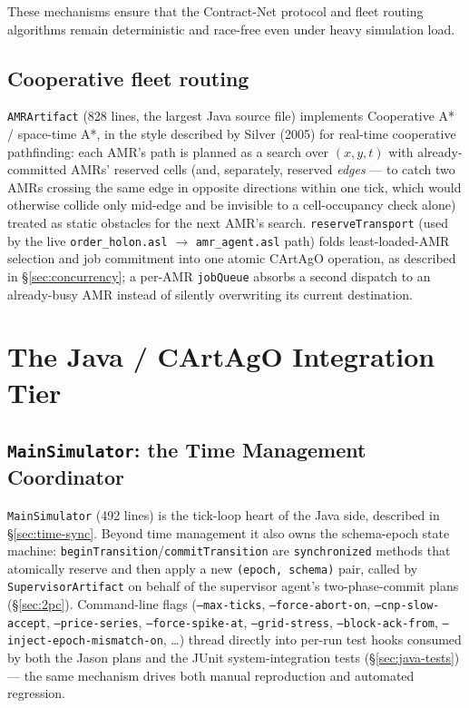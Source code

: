 \documentclass[twocolumn,10pt,a4paper]{article}
\newcommand{\code}[1]{\texttt{\small #1}}
\begin{document}
These mechanisms ensure that the Contract-Net protocol and fleet routing algorithms remain deterministic and race-free even under heavy simulation load.

\subsection{Cooperative fleet routing}
\code{AMRArtifact} (828 lines, the largest Java source file) implements Cooperative A* / space-time A*, in the style described by Silver (2005) for real-time cooperative pathfinding: each AMR's path is planned as a search over $(x, y, t)$ with already-committed AMRs' reserved cells (and, separately, reserved \emph{edges} --- to catch two AMRs crossing the same edge in opposite directions within one tick, which would otherwise collide only mid-edge and be invisible to a cell-occupancy check alone) treated as static obstacles for the next AMR's search. \code{reserveTransport} (used by the live \code{order\_holon.asl} $\to$ \code{amr\_agent.asl} path) folds least-loaded-AMR selection and job commitment into one atomic CArtAgO operation, as described in \S\ref{sec:concurrency}; a per-AMR \code{jobQueue} absorbs a second dispatch to an already-busy AMR instead of silently overwriting its current destination.

\section{The Java / CArtAgO Integration Tier}
\label{ch:java}

\subsection{\code{MainSimulator}: the Time Management Coordinator}
\code{MainSimulator} (492 lines) is the tick-loop heart of the Java side, described in \S\ref{sec:time-sync}. Beyond time management it also owns the schema-epoch state machine: \code{beginTransition}/\code{commitTransition} are \code{synchronized} methods that atomically reserve and then apply a new \code{(epoch, schema)} pair, called by \code{SupervisorArtifact} on behalf of the supervisor agent's two-phase-commit plans (\S\ref{sec:2pc}). Command-line flags (\code{--max-ticks}, \code{--force-abort-on}, \code{--cnp-slow-accept}, \code{--price-series}, \code{--force-spike-at}, \code{--grid-stress}, \code{--block-ack-from}, \code{--inject-epoch-mismatch-on}, \dots) thread directly into per-run test hooks consumed by both the Jason plans and the JUnit system-integration tests (\S\ref{sec:java-tests}) --- the same mechanism drives both manual reproduction and automated regression.
\end{document}
